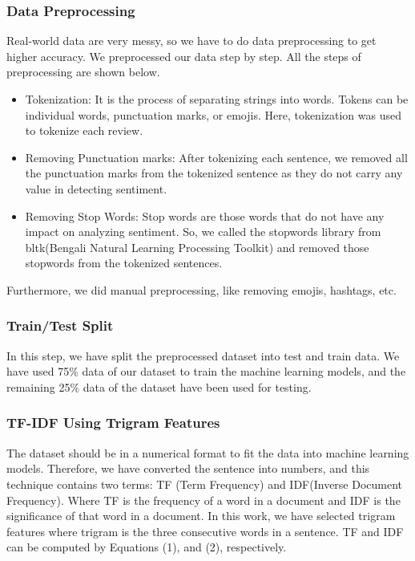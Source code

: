 \documentclass[conference]{IEEEtran}
\begin{document}
\subsubsection{Data Preprocessing}
Real-world data are very messy, so we have to do data preprocessing to get higher accuracy. We preprocessed our data step by step. All the steps of preprocessing are shown below.

\begin{itemize}
\vspace{1mm}
\item 	Tokenization: It is the process of separating strings into words. Tokens can be individual words, punctuation marks, or emojis. Here, tokenization was used to tokenize each review.   
\vspace{1mm}
\item 	Removing Punctuation marks: After tokenizing each sentence, we removed all the punctuation marks from the tokenized sentence as they do not carry any value in detecting sentiment.
\vspace{1mm}
\item 	Removing Stop Words:  Stop words are those words that do not have any impact on analyzing sentiment. So, we called the stopwords library from bltk(Bengali Natural Learning Processing Toolkit) and removed those stopwords from the tokenized sentences.
\vspace{1mm}

\end{itemize}

Furthermore, we did manual preprocessing, like removing emojis, hashtags, etc.

\vspace{4mm}
\subsubsection{Train/Test Split}
In this step, we have split the preprocessed dataset into test and train data. We have used 75\% data of our dataset to train the machine learning models, and the remaining 25\% data of the dataset have been used for testing.
\vspace{4mm}

\subsubsection{TF-IDF Using Trigram Features}

The dataset should be in a numerical format to fit the data into machine learning models. Therefore, we have converted the sentence into numbers, and this technique contains two terms: TF (Term Frequency) and IDF(Inverse Document Frequency). Where TF is the frequency of a word in a document and IDF is the significance of that word in a document. In this work, we have selected trigram features where trigram is the three consecutive words in a sentence. TF and IDF can be computed by Equations (1), and (2), respectively.
\par
\end{document}
